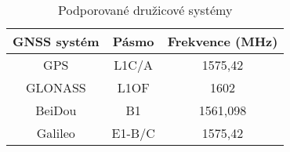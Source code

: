 \begin{table}[h!]
\centering
\begin{tabular}{c|c c }

GNSS systém & Pásmo & Frekvence (MHz) \\ 
\hline 
\hline
GPS & L1C/A & 1575,42 \\ 

GLONASS & L1OF & 1602 \\ 

BeiDou & B1 & 1561,098 \\ 

Galileo & E1-B/C & 1575,42 \\ 

\end{tabular} 
\caption{Podporované družicové systémy \cite{DLQg9bT6V1GWKhxh} }
\label{table:gnssBands}
\end{table} 
